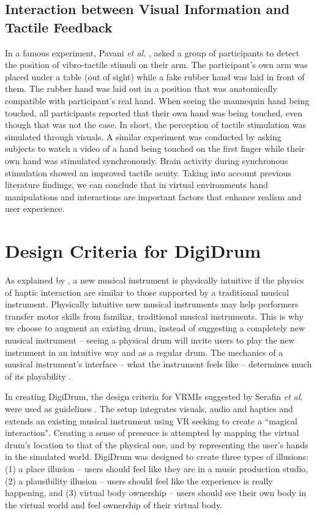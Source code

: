\documentclass{article}
\begin{document}
\subsection{Interaction between Visual Information and Tactile Feedback}
In a famous experiment, Pavani \emph{et al.} \cite{Pavani2000},  asked a group of participants to detect the position of vibro-tactile stimuli on their arm. The participant's own arm was placed under a table (out of sight) while a fake rubber hand was laid in front of them. The rubber hand was laid out in a position that was anatomically compatible with participant's real hand. When seeing the mannequin hand being touched, all participants reported that their own hand was being touched, even though that was not the case. In short, the perception of tactile stimulation was simulated through visuals. A similar experiment was conducted by \cite{Schaefer2006} asking subjects to watch a video of a hand being touched on the first finger while their own hand was stimulated synchronously. Brain activity during synchronous stimulation showed an improved tactile acuity. Taking into account previous literature findings, we can conclude that in virtual environments hand manipulations and interactions are important factors that enhance realism and user experience. 

\section{Design Criteria for DigiDrum}\label{sec:Design_criteria}

As explained by \cite{Berdahl2007API}, a new musical instrument is physically intuitive if the physics of haptic interaction are similar to those supported by a traditional musical instrument. Physically intuitive new musical instruments may help performers transfer motor skills from familiar, traditional musical instruments. This is why we choose to augment an existing drum, instead of suggesting a completely new musical instrument -- seeing a physical drum will invite users to play the new instrument in an intuitive way and as a regular drum. The mechanics of a musical instrument’s interface -- what the instrument feels like -- determines much of its playability \cite{O'Modhrain:2018}.

In creating DigiDrum, the design criteria for VRMIs suggested by Serafin \emph{et al.} were used as guidelines \cite{Serafin:2016}. The setup integrates visuals, audio and haptics and extends an existing musical instrument using VR seeking to create a ``magical interaction". Creating a sense of presence is attempted by mapping the virtual drum's location to that of the physical one, and by representing the user's hands in the simulated world. DigiDrum was designed to create three types of illusions: (1) a place illusion -- users should feel like they are in a music production studio, (2) a plausibility illusion -- users should feel like the experience is really happening, and (3) virtual body ownership -- users should see their own body in the virtual world and feel ownership of their virtual body.
\end{document}
